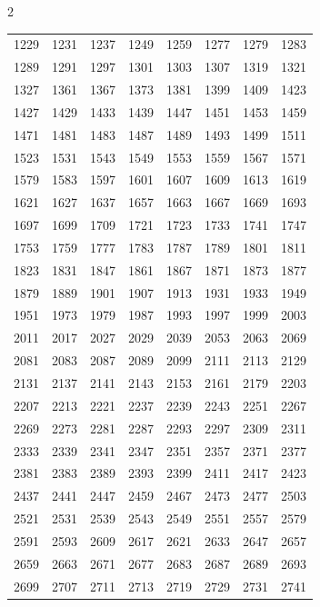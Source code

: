 \documentclass{article}
\begin{document}
\begin{multicols}{2}
\begin{tabular}{r r r r r r r r}
1229 & 1231 & 1237 & 1249 & 1259 & 1277 & 1279 & 1283\\
1289 & 1291 & 1297 & 1301 & 1303 & 1307 & 1319 & 1321\\
1327 & 1361 & 1367 & 1373 & 1381 & 1399 & 1409 & 1423\\
1427 & 1429 & 1433 & 1439 & 1447 & 1451 & 1453 & 1459\\
1471 & 1481 & 1483 & 1487 & 1489 & 1493 & 1499 & 1511\\
1523 & 1531 & 1543 & 1549 & 1553 & 1559 & 1567 & 1571\\
1579 & 1583 & 1597 & 1601 & 1607 & 1609 & 1613 & 1619\\
1621 & 1627 & 1637 & 1657 & 1663 & 1667 & 1669 & 1693\\
1697 & 1699 & 1709 & 1721 & 1723 & 1733 & 1741 & 1747\\
1753 & 1759 & 1777 & 1783 & 1787 & 1789 & 1801 & 1811\\
1823 & 1831 & 1847 & 1861 & 1867 & 1871 & 1873 & 1877\\
1879 & 1889 & 1901 & 1907 & 1913 & 1931 & 1933 & 1949\\
1951 & 1973 & 1979 & 1987 & 1993 & 1997 & 1999 & 2003\\
2011 & 2017 & 2027 & 2029 & 2039 & 2053 & 2063 & 2069\\
2081 & 2083 & 2087 & 2089 & 2099 & 2111 & 2113 & 2129\\
2131 & 2137 & 2141 & 2143 & 2153 & 2161 & 2179 & 2203\\
2207 & 2213 & 2221 & 2237 & 2239 & 2243 & 2251 & 2267\\
2269 & 2273 & 2281 & 2287 & 2293 & 2297 & 2309 & 2311\\
2333 & 2339 & 2341 & 2347 & 2351 & 2357 & 2371 & 2377\\
2381 & 2383 & 2389 & 2393 & 2399 & 2411 & 2417 & 2423\\
2437 & 2441 & 2447 & 2459 & 2467 & 2473 & 2477 & 2503\\
2521 & 2531 & 2539 & 2543 & 2549 & 2551 & 2557 & 2579\\
2591 & 2593 & 2609 & 2617 & 2621 & 2633 & 2647 & 2657\\
2659 & 2663 & 2671 & 2677 & 2683 & 2687 & 2689 & 2693\\
2699 & 2707 & 2711 & 2713 & 2719 & 2729 & 2731 & 2741\\
\end{tabular}


\end{multicols}
\end{document}
